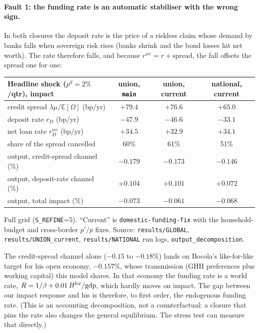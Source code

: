 \documentclass[11pt]{article}
\newcommand{\E}{\mathbb{E}}
\newcommand{\code}[1]{\texttt{\small #1}}
\begin{document}
\paragraph{Fault 1: the funding rate is an automatic stabiliser with the wrong sign.}
In both closures the deposit rate is the price of a riskless claim whose demand by banks falls
when sovereign risk rises (banks shrink and the bond losses hit net worth). The rate therefore
falls, and because $r^{wc}=r+\text{spread}$, the fall offsets the spread one for one:

\begin{center}
\small
\begin{tabular}{lccc}
\toprule
Headline shock ($p^d=2\%$/qtr), impact & union, \code{main} & union, current & national, current\\
\midrule
credit spread $\lambda\mu/\E[\Omega]$ (bp/yr) & $+79.4$ & $+76.6$ & $+65.0$\\
deposit rate $r_D$ (bp/yr) & $-47.9$ & $-46.6$ & $-33.1$\\
net loan rate $r^{wc}_D$ (bp/yr) & $+34.5$ & $+32.9$ & $+34.1$\\
share of the spread cancelled & 60\% & 61\% & 51\%\\
\addlinespace
output, credit-spread channel (\%) & $-0.179$ & $-0.173$ & $-0.146$\\
output, deposit-rate channel (\%) & $+0.104$ & $+0.101$ & $+0.072$\\
output, total impact (\%) & $-0.073$ & $-0.061$ & $-0.068$\\
\bottomrule
\end{tabular}
\end{center}
{\footnotesize Full grid (\code{S\_REFINE}=5). ``Current'' is \code{domestic-funding-fix} with
the household-budget and cross-border $p'/p$ fixes. Source: \code{results/GLOBAL},
\code{results/UNION\_current}, \code{results/NATIONAL} run logs, \code{output\_decomposition}.}

The credit-spread channel alone ($-0.15$ to $-0.18\%$) lands on Bocola's like-for-like target
for his open economy, $-0.157\%$, whose transmission (GHH preferences plus working capital) this
model shares. In that economy the funding rate is a world rate,
$R=1/\beta+0.01\,B^{\rm for}/\mathrm{gdp}$, which hardly moves on impact. The gap between our
impact response and his is therefore, to first order, the endogenous funding rate. (This is an
accounting decomposition, not a counterfactual: a closure that pins the rate also changes the
general equilibrium. The stress test can measure that directly.)
\end{document}
